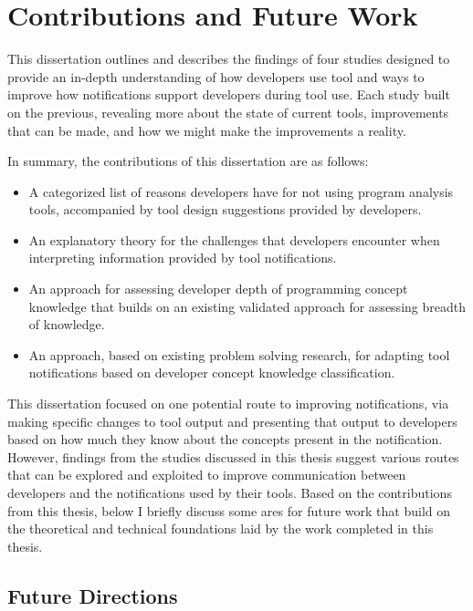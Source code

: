 \chapter{Contributions and Future Work}
\label{chap:future}

This dissertation outlines and describes the findings of four studies designed to provide an in-depth understanding of how developers use tool and ways to improve how notifications support developers during tool use. Each study built on the previous, revealing more about the state of current tools, improvements that can be made, and how we might make the improvements a reality. 

In summary, the contributions of this dissertation are as follows:
\begin{itemize}
    \item A categorized list of reasons developers have for not using program analysis tools, accompanied by tool design suggestions provided by developers.
    \item An explanatory theory for the challenges that developers encounter when interpreting information provided by tool notifications.
    \item An approach for assessing developer depth of programming concept knowledge that builds on an existing validated approach for assessing breadth of knowledge.
    \item An approach, based on existing problem solving research, for adapting tool notifications based on developer concept knowledge classification.
\end{itemize}

This dissertation focused on one potential route to improving notifications, via making specific changes to tool output and presenting that output to developers based on how much they know about the concepts present in the notification. However, findings from the studies discussed in this thesis suggest various routes that can be explored and exploited to improve communication between developers and the notifications used by their tools.
Based on the contributions from this thesis, below I briefly discuss some ares for future work that build on the theoretical and technical foundations laid by the work completed in this thesis.

\section{Future Directions}

